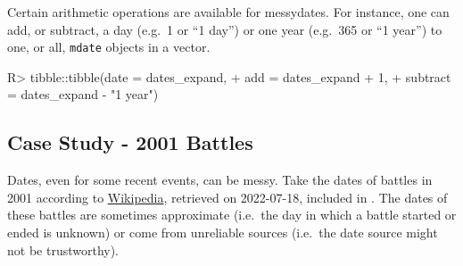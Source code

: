 \documentclass[
]{jss}
\begin{document}
Certain arithmetic operations are available for messydates. For
instance, one can add, or subtract, a day (e.g.~1 or ``1 day'') or one
year (e.g.~365 or ``1 year'') to one, or all, \texttt{mdate} objects in
a vector.

\begin{CodeChunk}
\begin{CodeInput}
R> tibble::tibble(date = dates_expand,
+                add = dates_expand + 1,
+                subtract = dates_expand - "1 year")
\end{CodeInput}
\begin{CodeOutput}
# A tibble: 5 x 3
  date                                add                                subtr~1
  <mdate>                             <mdate>                            <mdate>
1 2001-01                             2001-01-02..2001-02-01           ~ 2000-0~
2 2001-01-01..2001-01-12              2001-01-02..2001-01-13           ~ 2000-0~
3 {2001-01-01,2001-01-02,2001-01-03}  2001-01-02..2001-01-04           ~ 2000-0~
4 {2001-01-01,2001-02-01..2001-02-03} {2001-01-02,2001-02-02..2001-02-0~ {2000-~
5 2001-XX-01                          2001-XX-02                       ~ 2000-X~
# ... with abbreviated variable name 1: subtract
\end{CodeOutput}
\end{CodeChunk}

\hypertarget{case-study---2001-battles}{%
\subsection{Case Study - 2001 Battles}\label{case-study---2001-battles}}

Dates, even for some recent events, can be messy. Take the dates of
battles in 2001 according to
\href{https://en.wikipedia.org/wiki/List_of_battles_in_the_21st_century}{Wikipedia},
retrieved on 2022-07-18, included in . The dates of
these battles are sometimes approximate (i.e.~the day in which a battle
started or ended is unknown) or come from unreliable sources (i.e.~the
date source might not be trustworthy).
\end{document}
